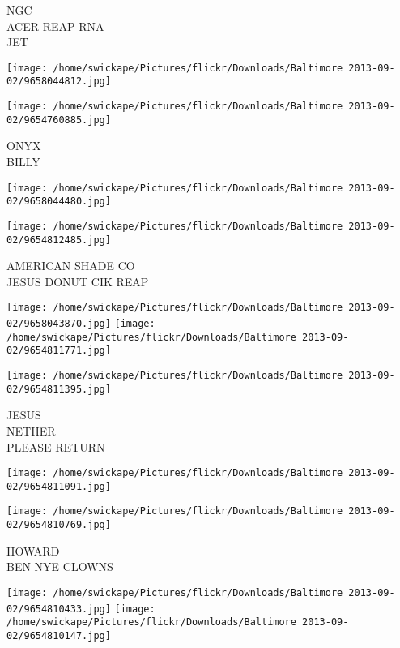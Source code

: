 \documentclass[10pt,letterpaper]{article}
\begin{document}
NGC\\
ACER REAP RNA\\
JET\\
\pagebreak

\texttt{[image: /home/swickape/Pictures/flickr/Downloads/Baltimore 2013-09-02/9658044812.jpg]}

\vspace{0.25in}
\texttt{[image: /home/swickape/Pictures/flickr/Downloads/Baltimore 2013-09-02/9654760885.jpg]}

ONYX\\
BILLY\\
\pagebreak

\texttt{[image: /home/swickape/Pictures/flickr/Downloads/Baltimore 2013-09-02/9658044480.jpg]}

\vspace{0.25in}
\texttt{[image: /home/swickape/Pictures/flickr/Downloads/Baltimore 2013-09-02/9654812485.jpg]}

AMERICAN SHADE CO\\
JESUS DONUT CIK REAP\\
\pagebreak

\texttt{[image: /home/swickape/Pictures/flickr/Downloads/Baltimore 2013-09-02/9658043870.jpg]}
\texttt{[image: /home/swickape/Pictures/flickr/Downloads/Baltimore 2013-09-02/9654811771.jpg]}

\vspace{0.25in}
\texttt{[image: /home/swickape/Pictures/flickr/Downloads/Baltimore 2013-09-02/9654811395.jpg]}

JESUS\\
NETHER\\
PLEASE RETURN\\
\pagebreak

\texttt{[image: /home/swickape/Pictures/flickr/Downloads/Baltimore 2013-09-02/9654811091.jpg]}

\vspace{0.25in}
\texttt{[image: /home/swickape/Pictures/flickr/Downloads/Baltimore 2013-09-02/9654810769.jpg]}

HOWARD\\
BEN NYE CLOWNS\\
\pagebreak

\texttt{[image: /home/swickape/Pictures/flickr/Downloads/Baltimore 2013-09-02/9654810433.jpg]}
\texttt{[image: /home/swickape/Pictures/flickr/Downloads/Baltimore 2013-09-02/9654810147.jpg]}
\end{document}
